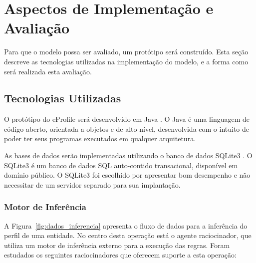 \chapter{Aspectos de Implementação e Avaliação}
\label{ch:implementacao}

Para que o modelo possa ser avaliado, um protótipo será construído. Esta seção descreve as tecnologias utilizadas na implementação do modelo, e a forma como será realizada esta avaliação.


\section{Tecnologias Utilizadas}
\label{sec:tecnologias}

O protótipo do eProfile será desenvolvido em Java \cite{java}. O Java é uma linguagem de código aberto, orientada a objetos e de alto nível, desenvolvida com o intuito de poder ter seus programas executados em qualquer arquitetura.

As bases de dados serão implementadas utilizando o banco de dados SQLite3 \cite{sqlite3}. O SQLite3 é um banco de dados SQL auto-contido transacional, disponível em domínio público. O SQLite3 foi escolhido por apresentar bom desempenho e não necessitar de um servidor separado para sua implantação.


\subsection{Motor de Inferência}
\label{sec:motor_inferencia}

A Figura~\ref{fig:dados_inferencia} apresenta o fluxo de dados para a inferência do perfil de uma entidade. No centro desta operação está o agente raciocinador, que utiliza um motor de inferência externo para a execução das regras. Foram estudados os seguintes raciocinadores que oferecem suporte a esta operação:

